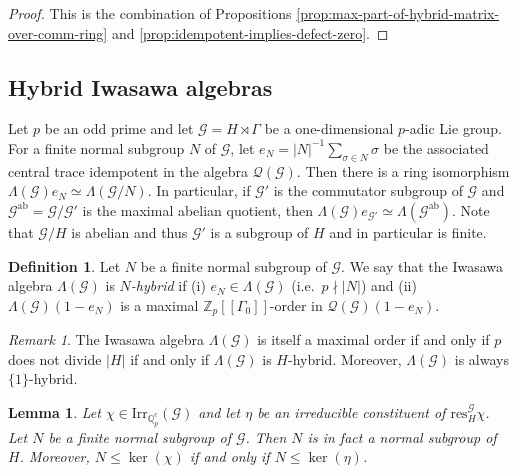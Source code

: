 \documentclass[12pt]{amsart}
\theoremstyle{plain}
\newtheorem{lemma}[theorem]{Lemma}
\theoremstyle{remark}
\newtheorem{remark}[theorem]{Remark}
\theoremstyle{definition}
\newtheorem{definition}[theorem]{Definition}
\numberwithin{equation}{section}
\begin{document}
\begin{proof}
This is the combination of Propositions \ref{prop:max-part-of-hybrid-matrix-over-comm-ring} and \ref{prop:idempotent-implies-defect-zero}.
\end{proof}

\subsection{Hybrid Iwasawa algebras}
Let $p$ be an odd prime and let $\mathcal{G} = H \rtimes \Gamma$ be a one-dimensional $p$-adic Lie group.
For a finite normal subgroup $N$ of $\mathcal{G}$, let $e_{N} = |N|^{-1}\sum_{\sigma \in N} \sigma$
be the associated central trace idempotent in the  algebra $\mathcal{Q}(\mathcal{G})$.
Then there is a ring isomorphism $\Lambda(\mathcal{G})e_{N} \simeq \Lambda(\mathcal{G}/N)$.
In particular, if $\mathcal{G}'$ is the commutator subgroup of $\mathcal{G}$ and
$\mathcal{G}^{\mathrm{ab}}=\mathcal{G}/\mathcal{G}'$ is the maximal abelian quotient,
then $\Lambda(\mathcal{G})e_{\mathcal{G}'} \simeq \Lambda(\mathcal{G}^{\mathrm{ab}})$.
Note that $\mathcal{G}/H$ is abelian and thus $\mathcal{G}'$ is a subgroup of $H$ and in particular is finite.

\begin{definition}\label{def:max-comm-hybrid}
Let $N$ be a finite normal subgroup of $\mathcal{G}$.
We say that the Iwasawa algebra $\Lambda(\mathcal{G})$ is \emph{$N$-hybrid}
if (i) $e_{N} \in \Lambda(\mathcal{G})$ (i.e.\ $p \nmid |N|$) and
(ii) $\Lambda(\mathcal{G})(1-e_{N})$ is a maximal ${\mathbb{Z}}_{p}[[\Gamma_{0}]]$-order in
$\mathcal{Q}(\mathcal{G})(1-e_{N})$.
\end{definition}

\begin{remark}\label{rmk:p-not-divide-H-max-order}
The Iwasawa algebra $\Lambda(\mathcal{G})$ is itself a maximal order if and only if $p$ does not divide $|H|$ if and only if 
$\Lambda(\mathcal{G})$ is $H$-hybrid. Moreover, $\Lambda(\mathcal{G})$ is always $\{ 1 \}$-hybrid.
\end{remark}

\begin{lemma}\label{lem:kernel-criterion}
Let $\chi \in {\mathrm{Irr}}_{{\mathbb{Q}}_{p}^{c}}(\mathcal{G})$ and let $\eta$ be an irreducible constituent of ${\mathrm{res}}^{\mathcal{G}}_{H} \chi$.
Let $N$ be a finite normal subgroup of $\mathcal{G}$.
Then $N$ is in fact a normal subgroup of $H$.
Moreover, $N \leq \ker(\chi)$ if and only if $N \leq \ker(\eta)$.
\end{lemma}
\end{document}
